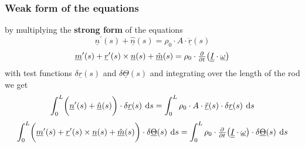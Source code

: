 \begin{frame}
  \frametitle{Weak form of the equations}

  by multiplying the \textbf{strong form} of the equations
  \begin{displaymath}
    \underline{n}^{\prime}(s) + \underline{\hat{n}}(s) =
    \rho_0 \cdot A \cdot \underline{\ddot{r}}(s)
  \end{displaymath}
  \begin{displaymath}
    \underline{m}^{\prime}(s) + \underline{r}^{\prime}(s) \times \underline{n}(s) + \underline{\hat{m}}(s) =
    \rho_0 \cdot
    \pd{}{t} \bigl( \doubleunderline{I} \cdot \underline{\omega} \bigr)
  \end{displaymath}
  with test functions $\delta \underline{r}(s)$ and $\delta \underline{\Theta}(s)$ and integrating over the length of the rod we get
  \begin{displaymath}
    \int_0^L \biggl( \underline{n}^{\prime}(s) + \underline{\hat{n}}(s) \biggr) \cdot \delta \underline{r}(s) \: \dif s  =
    \int_0^L \rho_0 \cdot A \cdot \underline{\ddot{r}}(s) \cdot \delta \underline{r}(s) \: \dif s
  \end{displaymath}
  \begin{displaymath}
    \int_0^L \biggl( \underline{m}^{\prime}(s) + \underline{r}^{\prime}(s) \times \underline{n}(s) + \underline{\hat{m}}(s) \biggr) \cdot \delta \underline{\Theta}(s) \: \dif s =
    \int_0^L \rho_0 \cdot
    \pd{}{t} \bigl( \doubleunderline{I} \cdot \underline{\omega} \bigr) \cdot \delta \underline{\Theta}(s) \: \dif s
  \end{displaymath}

  

\end{frame}
